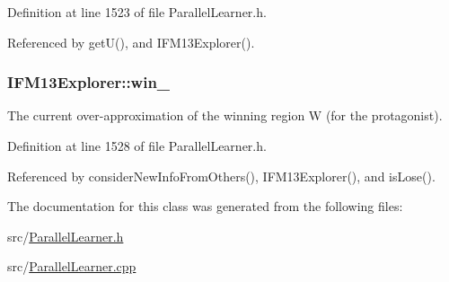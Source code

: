 Definition at line 1523 of file Parallel\-Learner.\-h.



Referenced by get\-U(), and I\-F\-M13\-Explorer().

\hypertarget{classIFM13Explorer_ac18c17a8e34556f0ad500c471a74f6ce}{
\subsubsection[{win\-\_\-}]{ I\-F\-M13\-Explorer\-::win\-\_\-\hspace{0.3cm}{\ttfamily [protected]}}}\label{classIFM13Explorer_ac18c17a8e34556f0ad500c471a74f6ce}


The current over-\/approximation of the winning region W (for the protagonist). 



Definition at line 1528 of file Parallel\-Learner.\-h.



Referenced by consider\-New\-Info\-From\-Others(), I\-F\-M13\-Explorer(), and is\-Lose().



The documentation for this class was generated from the following files\-:\begin{DoxyCompactItemize}
\item 
src/\hyperlink{ParallelLearner_8h}{Parallel\-Learner.\-h}\item 
src/\hyperlink{ParallelLearner_8cpp}{Parallel\-Learner.\-cpp}\end{DoxyCompactItemize}
